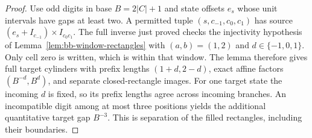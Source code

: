 \begin{proof}
Use odd digits in base $B=2|C|+1$ and state offsets $e_s$ whose
unit intervals have gaps at least two.  A permitted tuple
$(s,c_{-1},c_0,c_1)$ has source
$(e_s+I_{c_{-1}})\times I_{c_0c_1}$.  The full inverse just proved
checks the injectivity hypothesis of Lemma~\ref{lem:bb-window-rectangles}
with $(a,b)=(1,2)$ and $d\in\{-1,0,1\}$.
Only cell zero is written, which is within that window.  The lemma
therefore gives full target cylinders with prefix lengths
$(1+d,2-d)$, exact affine factors $(B^{-d},B^d)$, and separate
closed-rectangle images.  For one target state the incoming $d$ is
fixed, so its prefix lengths agree across incoming branches.  An
incompatible digit among at most three positions yields the additional
quantitative target gap $B^{-3}$.  This is separation of the filled
rectangles, including their boundaries.
\end{proof}


